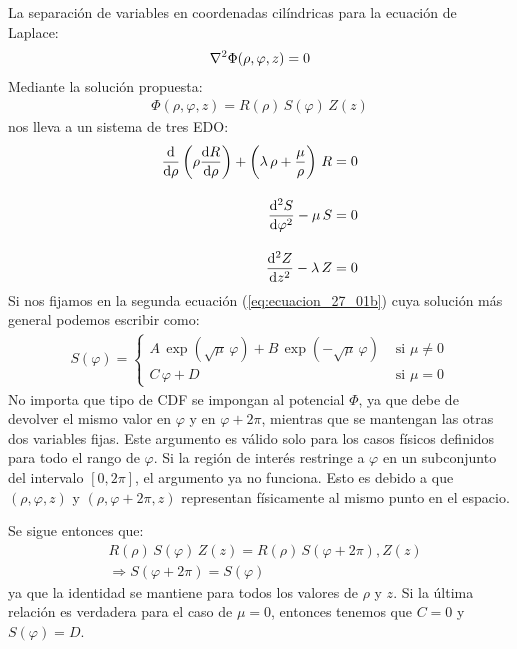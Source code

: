 \documentclass[12pt]{article}
\numberwithin{equation}{section}
\begin{document}
La separación de variables en coordenadas cilíndricas para la ecuación de Laplace:
\begin{align*}
\laplacian{\Phi} (\rho, \varphi, z) = 0
\end{align*}
Mediante la solución propuesta:
\begin{align*}
\Phi (\rho, \varphi, z) = R (\rho) \, S (\varphi) \, Z (z)
\end{align*}
nos lleva a un sistema de tres EDO:
\begin{subequations}
\begin{align}
\dv{\rho} \left( \rho \dv{R}{\rho} \right) + \left( \lambda \, \rho + \dfrac{\mu}{\rho} \right) \, R &= 0 \label{eq:ecuacion_27_01a} \\[1em] 
\dv[2]{S}{\varphi} - \mu \, S &= 0 \label{eq:ecuacion_27_01b} \\[1em] 
\dv[2]{Z}{z} - \lambda \, Z &= 0 \label{eq:ecuacion_27_01c}
\end{align}
\end{subequations}
Si nos fijamos en la segunda ecuación (\ref{eq:ecuacion_27_01b}) cuya solución más general podemos escribir como:
\begin{align}
S (\varphi) = \begin{cases}
A \, \exp(\sqrt{\mu} \, \varphi) {+} B \, \exp(-\sqrt{\mu} \, \varphi) & \mbox{ si } \mu \neq 0 \\
C \,\varphi + D & \mbox { si } \mu = 0
\end{cases}
\label{eq:ecuacion_27_02}
\end{align}
No importa que tipo de CDF se impongan al potencial $\Phi$,  ya que debe de devolver el mismo valor en $\varphi$ y en $\varphi + 2 \pi$, mientras que se mantengan las otras dos variables fijas. Este argumento es válido solo para los casos físicos definidos para todo el rango de $\varphi$. Si la región de interés restringe a $\varphi$ en un subconjunto del intervalo $[0, 2 \pi]$, el argumento ya no funciona. Esto es debido a que $(\rho, \varphi, z)$ y $(\rho, \varphi + 2 \pi, z)$ representan físicamente al mismo punto en el espacio.
\par
Se sigue entonces que:
\begin{eqnarray*}
&R (\rho) \, S (\varphi) \, Z (z) = R (\rho) \, S (\varphi + 2 \pi), Z (z) \\[0.5em] 
&\Longrightarrow S (\varphi + 2 \pi) = S (\varphi)
\end{eqnarray*}
ya que la identidad se mantiene para todos los valores de $\rho$ y $z$. Si la última relación es verdadera para el caso de $\mu = 0$,  entonces tenemos que $C = 0$ y $S (\varphi) = D$.
\end{document}
